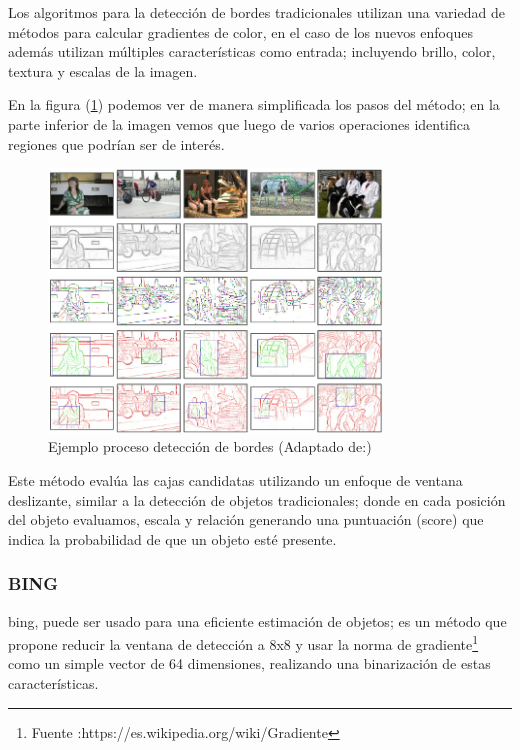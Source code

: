 Los algoritmos para la detección de bordes tradicionales utilizan una variedad de métodos para calcular gradientes de color, en el caso de los nuevos enfoques además utilizan múltiples características como entrada; incluyendo brillo, color, textura y  escalas de la imagen. 

En la figura (\ref{Fig: edges}) podemos ver de manera simplificada los pasos del método;  en la parte inferior de la imagen vemos que luego de varios operaciones identifica regiones que podrían ser de interés.

\begin{figure}[H]
 \centering
  \includegraphics[height=7cm,keepaspectratio=true,clip=true]{imagenes/Logos/edges.png}
  \caption{Ejemplo proceso detección de bordes (Adaptado de:\citep{edges})}
	\label{Fig: edges}
\end{figure}

Este método evalúa las cajas candidatas utilizando un enfoque de ventana deslizante, similar a la detección de objetos tradicionales; donde en cada posición del objeto evaluamos, escala y relación generando una puntuación (score) que indica la probabilidad de que un objeto esté presente.

\subsubsection{BING} \label{sub:bing}
\ac{bing}, puede ser usado para una eficiente estimación de objetos; es un método que propone reducir la ventana de detección a 8x8 y usar la norma de gradiente\footnote{Fuente :https://es.wikipedia.org/wiki/Gradiente} como  un simple vector de 64 dimensiones, realizando una binarización  de estas características.

